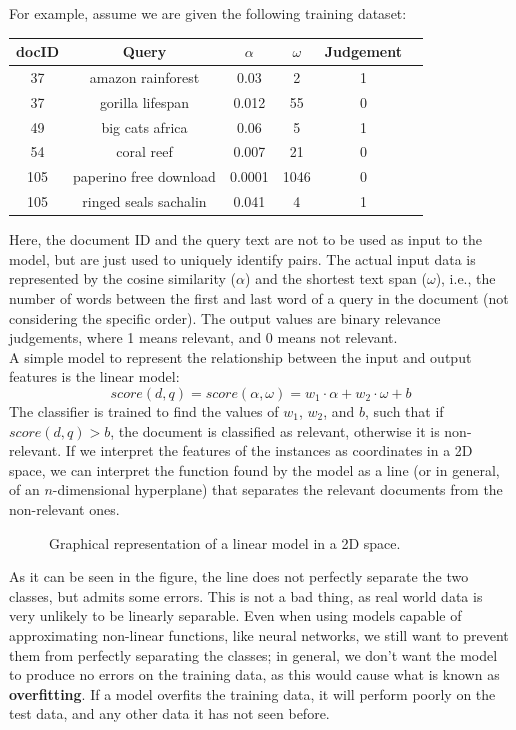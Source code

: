 For example, assume we are given the following training dataset:
\begin{table}[H]
    \centering
    \begin{tabular}{|c|c||c|c|c|c|}
    \hline
    docID & Query & $\alpha$ & $\omega$ & Judgement \\
    \hline
    37 & amazon rainforest & 0.03 & 2 & 1 \\
    37 & gorilla lifespan & 0.012 & 55 & 0 \\
    49 & big cats africa & 0.06 & 5 & 1 \\
    54 & coral reef & 0.007 & 21 & 0 \\
    105 & paperino free download & 0.0001 & 1046 & 0 \\
    105 & ringed seals sachalin & 0.041 & 4 & 1 \\
    \hline
    \end{tabular} 
\end{table} 
Here, the document ID and the query text are not to be used as input to the model, but are just used to uniquely identify pairs. The actual input data is represented by the cosine similarity ($\alpha$) and the shortest text span ($\omega$), i.e., the number of words between the first and last word of a query in the document (not considering the specific order). The output values are binary relevance judgements, where 1 means relevant, and 0 means not relevant. \\
A simple model to represent the relationship between the input and output features is the linear model:
\begin{equation*}
    \textit{score}(d,q) = \textit{score}(\alpha, \omega) = w_1 \cdot \alpha + w_2 \cdot \omega + b
\end{equation*}
The classifier is trained to find the values of $w_1$, $w_2$, and $b$, such that if $\textit{score}(d,q) > b$, the document is classified as relevant, otherwise it is non-relevant. If we interpret the features of the instances as coordinates in a 2D space, we can interpret the function found by the model as a line (or in general, of an $n$-dimensional hyperplane) that separates the relevant documents from the non-relevant ones.
\begin{figure}[H]
    \centering
    
    \caption{Graphical representation of a linear model in a 2D space.}
\end{figure}
As it can be seen in the figure, the line does not perfectly separate the two classes, but admits some errors. This is not a bad thing, as real world data is very unlikely to be linearly separable. Even when using models capable of approximating non-linear functions, like neural networks, we still want to prevent them from perfectly separating the classes; in general, we don't want the model to produce no errors on the training data, as this would cause what is known as \textbf{overfitting}. If a model overfits the training data, it will perform poorly on the test data, and any other data it has not seen before.


